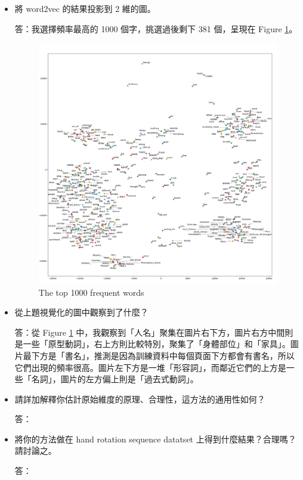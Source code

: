 \documentclass[12pt,a4paper]{extarticle}
\begin{document}
\begin{itemize}
  \item[2.2] 將 word2vec 的結果投影到 2 維的圖。
  \par 答：我選擇頻率最高的 1000 個字，挑選過後剩下 381 個，呈現在 Figure \ref{fig:wordvec-es64-top1000}。

  \begin{figure}[ht]
    \centering
    \includegraphics[width=0.8\linewidth]{images/wordvec-es64-top1000.png}
    \caption{The top 1000 frequent words}
    \label{fig:wordvec-es64-top1000}
  \end{figure}

  \item[2.3] 從上題視覺化的圖中觀察到了什麼？
  \par 答：從 Figure \ref{fig:wordvec-es64-top1000} 中，我觀察到「人名」聚集在圖片右下方，圖片右方中間則是一些「原型動詞」，右上方則比較特別，聚集了「身體部位」和「家具」。圖片最下方是「書名」，推測是因為訓練資料中每個頁面下方都會有書名，所以它們出現的頻率很高。圖片左下方是一堆「形容詞」，而鄰近它們的上方是一些「名詞」，圖片的左方偏上則是「過去式動詞」。

  \item[3.1] 請詳加解釋你估計原始維度的原理、合理性，這方法的通用性如何？
  \par 答：

  \item[3.2] 將你的方法做在 hand rotation sequence datatset 上得到什麼結果？合理嗎？請討論之。
  \par 答：

\end{itemize}
\end{document}
